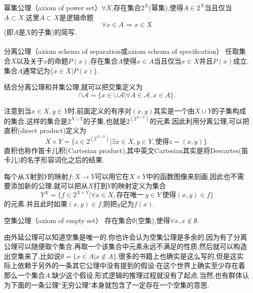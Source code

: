幂集公理（axiom of power set）$\forall X$,存在集合$2^{X}$(幂集),使得$A\in 2^{X}$当且仅当 $A\subset X$.这里$A\subset X$是逻辑命题
\begin{equation}
\forall x\in A\Rightarrow x\in X
\end{equation}
(即$A$是$X$的子集)的简写.
\\ \hspace*{\fill} \\%
分离公理（axiom schema of separation或axiom schema of specification） 任取集合$X$以及关于$x$的命题$P(x)$,存在集合$A$使得$x\in A$当且仅当$x\in X$并且$P(x)$成立.集合$A$通常记为$\{x\in X|P(x)\}$.

结合分离公理和并集公理,就可以把交集定义为
\begin{equation}
\cap \mathcal{A} = \{x\in\cup\mathcal{A}|\forall A\in\mathcal{A},x\in A \}.
\end{equation}



注意到当$x\in X,y\in Y$时,前面定义的有序对$(x,y)$其实是一个由$X\cup Y$的子集构成的集合,这样的集合是$2^{X\cup Y}$的子集,也就是$2^{(2^{X\cup Y})}$的元素,因此利用分离公理,可以把直积(direct product)定义为
\begin{equation}
X\times Y = \{ z\in 2^{(2^{X\cup Y})}| \exists x\in X,y\in Y,\text{使得}z=(x,y) \}.
\end{equation}
直积也称作笛卡儿积(Cartesian product),其中英文Cartesian其实是将Descartes(笛卡儿)的名字形容词化之后的结果.

每个从$X$射到$Y$的映射$f:X\rightarrow Y$可以用它在$X\times Y$中的函数图像来刻画,因此也不需要添加新的公理,就可以把从$X$打到$Y$的映射定义为集合
\begin{equation}
Y^X = \{f\in 2^{X\times Y} | \forall x\in X,\text{存在唯一}\ y\in Y\ \text{使得}(x,y)\in f \}
\end{equation}
的元素.并且此时如果$(x,y)\in f$,则把$y$记为$f(x)$.



空集公理（axiom of empty set） 存在集合$\emptyset$(空集),使得$\forall x,x\notin \emptyset$.

由外延公理可以知道空集是唯一的.你也许会认为空集公理是多余的,因为有了分离公理可以随便取个集合,再取一个该集合中元素永远不满足的性质,然后就可以构造出空集来了,比如说$\emptyset=\{x\in A|x\notin A\}$.很多的书籍上也确实是这么写的,但是这实际上依赖于另外的一条其它公理中没有提到的假设:在这个世界上确实至少存在着那么一个集合$A$.缺少这个假设,形式逻辑的推理过程就没有了起点.当然,也有群体认为下面的一条公理"无穷公理"本身就包含了一定存在一个空集的意思.



